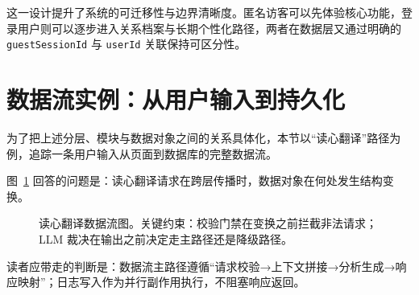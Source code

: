 这一设计提升了系统的可迁移性与边界清晰度。匿名访客可以先体验核心功能，登录用户则可以逐步进入关系档案与长期个性化路径，两者在数据层又通过明确的 \texttt{guestSessionId} 与 \texttt{userId} 关联保持可区分性。

\section{数据流实例：从用户输入到持久化}


为了把上述分层、模块与数据对象之间的关系具体化，本节以“读心翻译”路径为例，追踪一条用户输入从页面到数据库的完整数据流。

图~\ref{fig:pebble-decode-dataflow} 回答的问题是：读心翻译请求在跨层传播时，数据对象在何处发生结构变换。

\begin{figure}[H]
  \centering
  
  \caption{读心翻译数据流图。关键约束：校验门禁在变换之前拦截非法请求；LLM 裁决在输出之前决定走主路径还是降级路径。}
  \label{fig:pebble-decode-dataflow}
\end{figure}

读者应带走的判断是：数据流主路径遵循“请求校验→上下文拼接→分析生成→响应映射”；日志写入作为并行副作用执行，不阻塞响应返回。

